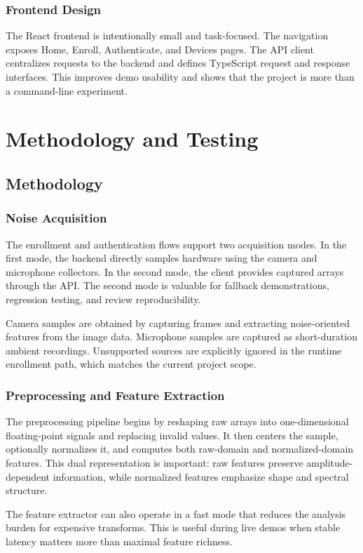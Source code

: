 \documentclass[12pt]{report}
\begin{document}
\subsection{Frontend Design}
The React frontend is intentionally small and task-focused. The navigation exposes Home, Enroll, Authenticate, and Devices pages. The API client centralizes requests to the backend and defines TypeScript request and response interfaces. This improves demo usability and shows that the project is more than a command-line experiment.

\chapter{Methodology and Testing}
\section{Methodology}
\subsection{Noise Acquisition}
The enrollment and authentication flows support two acquisition modes. In the first mode, the backend directly samples hardware using the camera and microphone collectors. In the second mode, the client provides captured arrays through the API. The second mode is valuable for fallback demonstrations, regression testing, and review reproducibility.

Camera samples are obtained by capturing frames and extracting noise-oriented features from the image data. Microphone samples are captured as short-duration ambient recordings. Unsupported sources are explicitly ignored in the runtime enrollment path, which matches the current project scope.

\subsection{Preprocessing and Feature Extraction}
The preprocessing pipeline begins by reshaping raw arrays into one-dimensional floating-point signals and replacing invalid values. It then centers the sample, optionally normalizes it, and computes both raw-domain and normalized-domain features. This dual representation is important: raw features preserve amplitude-dependent information, while normalized features emphasize shape and spectral structure.

The feature extractor can also operate in a fast mode that reduces the analysis burden for expensive transforms. This is useful during live demos when stable latency matters more than maximal feature richness.
\end{document}
